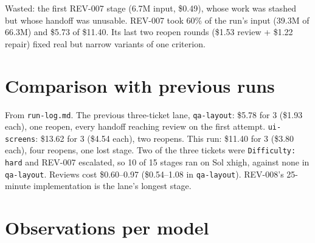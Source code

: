 \documentclass[11pt,a4paper]{article}
\begin{document}
Wasted: the first REV-007 stage (6.7M input, \$0.49), whose work was stashed but whose handoff was
unusable. REV-007 took 60\% of the run's input (39.3M of 66.3M) and \$5.73 of \$11.40. Its last
two reopen rounds (\$1.53 review + \$1.22 repair) fixed real but narrow variants of one criterion.

\section*{Comparison with previous runs}

From \texttt{run-log.md}. The previous three-ticket lane, \texttt{qa-layout}: \$5.78 for 3 (\$1.93
each), one reopen, every handoff reaching review on the first attempt. \texttt{ui-screens}: \$13.62
for 3 (\$4.54 each), two reopens. This run: \$11.40 for 3 (\$3.80 each), four reopens, one lost
stage. Two of the three tickets were \texttt{Difficulty: hard} and REV-007 escalated, so 10 of 15
stages ran on Sol xhigh, against none in \texttt{qa-layout}. Reviews cost \$0.60--0.97
(\$0.54--1.08 in \texttt{qa-layout}). REV-008's 25-minute implementation is the lane's longest
stage.

\section*{Observations per model}
\end{document}
